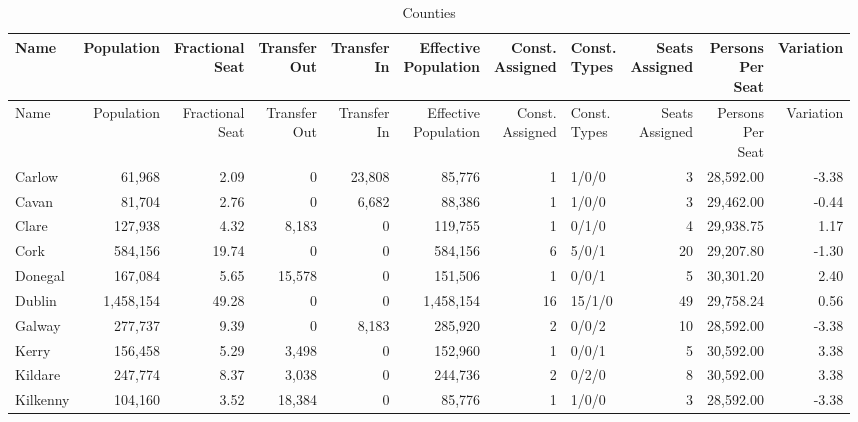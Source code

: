 \documentclass[a4paper]{article}
\begin{document}
\begin{longtable}{lrrrrrrlrrr}
\caption{Counties}
\\ \toprule
Name &Population &\shortstack{Fractional\\Seat} &\shortstack{Transfer\\Out} &\shortstack{Transfer\\In} &\shortstack{Effective\\Population} &\shortstack{Const.\\Assigned} &\shortstack{Const.\\Types} &\shortstack{Seats\\Assigned} &\shortstack{Persons\\Per\\Seat} &Variation \\ \midrule
\endfirsthead
\toprule
Name &Population &\shortstack{Fractional\\Seat} &\shortstack{Transfer\\Out} &\shortstack{Transfer\\In} &\shortstack{Effective\\Population} &\shortstack{Const.\\Assigned} &\shortstack{Const.\\Types} &\shortstack{Seats\\Assigned} &\shortstack{Persons\\Per\\Seat} &Variation \\ \midrule
\endhead
\bottomrule
\endfoot
Carlow&61,968& 2.09&0&23,808&85,776&1&1/0/0&3&28,592.00&-3.38\\ 
Cavan&81,704& 2.76&0&6,682&88,386&1&1/0/0&3&29,462.00&-0.44\\ 
Clare&127,938& 4.32&8,183&0&119,755&1&0/1/0&4&29,938.75& 1.17\\ 
Cork&584,156&19.74&0&0&584,156&6&5/0/1&20&29,207.80&-1.30\\ 
Donegal&167,084& 5.65&15,578&0&151,506&1&0/0/1&5&30,301.20& 2.40\\ 
Dublin&1,458,154&49.28&0&0&1,458,154&16&15/1/0&49&29,758.24& 0.56\\ 
Galway&277,737& 9.39&0&8,183&285,920&2&0/0/2&10&28,592.00&-3.38\\ 
Kerry&156,458& 5.29&3,498&0&152,960&1&0/0/1&5&30,592.00& 3.38\\ 
Kildare&247,774& 8.37&3,038&0&244,736&2&0/2/0&8&30,592.00& 3.38\\ 
Kilkenny&104,160& 3.52&18,384&0&85,776&1&1/0/0&3&28,592.00&-3.38\\ 

\end{longtable}
\end{document}
